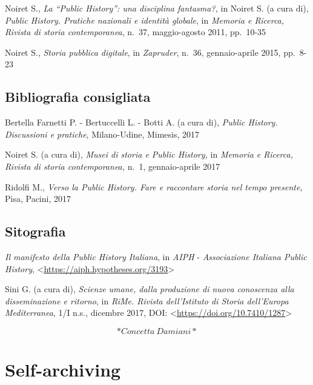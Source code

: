 \documentclass[
  b5paper,
  twoside,
  12pt,
  chapterprefix=false,
  bibliography=totocnumbered,
  parskip=false]{scrbook}
\begin{document}
Noiret S., \emph{La \enquote{Public History}: una disciplina fantasma?,} in Noiret S.
(a cura di), \emph{Public History. Pratiche nazionali e identità globale}, in
\emph{Memoria e Ricerca, Rivista di storia contemporanea}, n.~37,
maggio-agosto 2011, pp.~10-35

Noiret S., \emph{Storia pubblica digitale}, in \emph{Zapruder}, n.~36,
gennaio-aprile 2015, pp.~8-23

\hypertarget{bibliografia-consigliata-21}{%
\section*{Bibliografia consigliata}\label{bibliografia-consigliata-21}}

Bertella Farnetti P. - Bertuccelli L. - Botti A. (a cura di), \emph{Public
History. Discussioni e pratiche}, Milano-Udine, Mimesis, 2017

Noiret S. (a cura di), \emph{Musei di storia e Public History,} in \emph{Memoria e
Ricerca, Rivista di storia contemporanea,} n.~1, gennaio-aprile 2017

Ridolfi M., \emph{Verso la Public History. Fare e raccontare storia nel tempo
presente}, Pisa, Pacini, 2017

\hypertarget{sitografia-27}{%
\section*{Sitografia}\label{sitografia-27}}

\emph{Il manifesto della Public History Italiana}, in \emph{AIPH} - \emph{Associazione
Italiana Public History},
\textless{}\href{https://aiph.hypotheses.org/3193}{{https://aiph.hypotheses.org/3193}}\textgreater{}

Sini G. (a cura di), \emph{Scienze umane, dalla produzione di nuova
conoscenza alla disseminazione e ritorno}, in \emph{RiMe. Rivista
dell'Istituto di Storia dell'Europa Mediterranea}, 1/I n.s., dicembre
2017, DOI:
\textless{}\href{https://doi.org/10.7410/1287}{{https://doi.org/10.7410/1287}}\textgreater{}

\[*Concetta~Damiani*\]

\hypertarget{self-archiving}{%
\chapter{Self-archiving}\label{self-archiving}}
\end{document}
